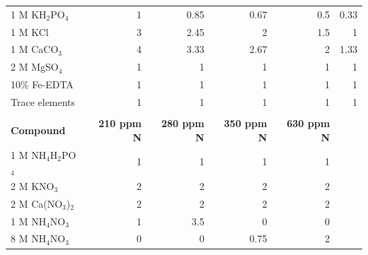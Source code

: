 \begin{table}[!h]
{\begin{tabular}{p{4cm}p{2cm}p{2cm}p{2cm}p{2cm}p{2cm}}
        1 M KH$_2$PO$_4$        & \multicolumn{1}{r}{1}         & \multicolumn{1}{r}{0.85}      & \multicolumn{1}{r}{0.67}      & \multicolumn{1}{r}{0.5}       & \multicolumn{1}{r}{0.33} \\
        1 M KCl                 & \multicolumn{1}{r}{3}         & \multicolumn{1}{r}{2.45}      & \multicolumn{1}{r}{2}         & \multicolumn{1}{r}{1.5}       & \multicolumn{1}{r}{1}    \\
        1 M CaCO$_3$            & \multicolumn{1}{r}{4}         & \multicolumn{1}{r}{3.33}      & \multicolumn{1}{r}{2.67}      & \multicolumn{1}{r}{2}         & \multicolumn{1}{r}{1.33} \\
        2 M MgSO$_4$            & \multicolumn{1}{r}{1}         & \multicolumn{1}{r}{1}         & \multicolumn{1}{r}{1}         & \multicolumn{1}{r}{1}         & \multicolumn{1}{r}{1}    \\
        10\% Fe-EDTA            & \multicolumn{1}{r}{1}         & \multicolumn{1}{r}{1}         & \multicolumn{1}{r}{1}         & \multicolumn{1}{r}{1}         & \multicolumn{1}{r}{1}    \\
        Trace elements          & \multicolumn{1}{r}{1}         & \multicolumn{1}{r}{1}         & \multicolumn{1}{r}{1}         & \multicolumn{1}{r}{1}         & \multicolumn{1}{r}{1}    \\
        \hline
        &&&&&
        \\
        \hline
        \textbf{Compound}
        & \multicolumn{1}{r}{\textbf{210 ppm N}}
        & \multicolumn{1}{r}{\textbf{280 ppm N}}
        & \multicolumn{1}{r}{\textbf{350 ppm N}}
        & \multicolumn{1}{r}{\textbf{630 ppm N}} &
        \\
        \hline
        1 M NH$_4$H$_2$PO$_4$   & \multicolumn{1}{r}{1}         & \multicolumn{1}{r}{1}         & \multicolumn{1}{r}{1}         & \multicolumn{1}{r}{1}         &   \\
        2 M KNO$_3$             & \multicolumn{1}{r}{2}         & \multicolumn{1}{r}{2}         & \multicolumn{1}{r}{2}         & \multicolumn{1}{r}{2}         &   \\
        2 M Ca(NO$_3$)$_2$      & \multicolumn{1}{r}{2}         & \multicolumn{1}{r}{2}         & \multicolumn{1}{r}{2}         & \multicolumn{1}{r}{2}         &   \\
        1 M NH$_4$NO$_3$        & \multicolumn{1}{r}{1}         & \multicolumn{1}{r}{3.5}       & \multicolumn{1}{r}{0}         & \multicolumn{1}{r}{0}         &   \\
        8 M NH$_4$NO$_3$        & \multicolumn{1}{r}{0}         & \multicolumn{1}{r}{0}         & \multicolumn{1}{r}{0.75}      & \multicolumn{1}{r}{2}         &   \\

\end{tabular}}
\end{table}
